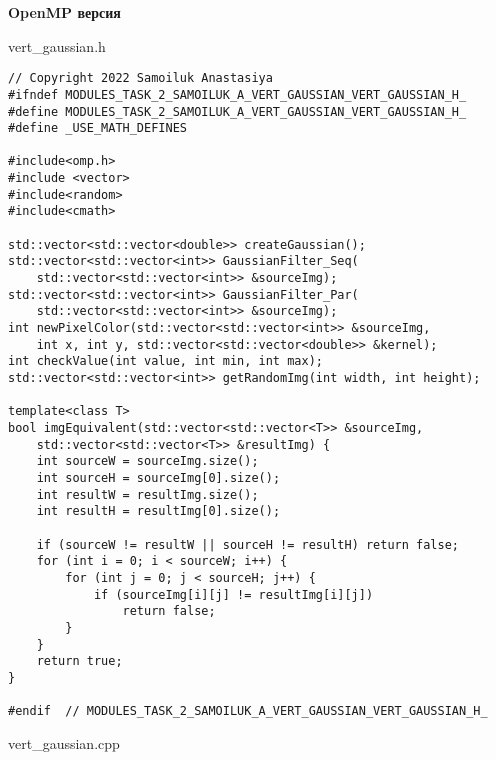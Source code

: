 \documentclass{report}
\begin{document}
\textbf{OpenMP версия}
\par vert\_gaussian.h
\begin{lstlisting}
// Copyright 2022 Samoiluk Anastasiya
#ifndef MODULES_TASK_2_SAMOILUK_A_VERT_GAUSSIAN_VERT_GAUSSIAN_H_
#define MODULES_TASK_2_SAMOILUK_A_VERT_GAUSSIAN_VERT_GAUSSIAN_H_
#define _USE_MATH_DEFINES

#include<omp.h>
#include <vector>
#include<random>
#include<cmath>

std::vector<std::vector<double>> createGaussian();
std::vector<std::vector<int>> GaussianFilter_Seq(
    std::vector<std::vector<int>> &sourceImg);
std::vector<std::vector<int>> GaussianFilter_Par(
    std::vector<std::vector<int>> &sourceImg);
int newPixelColor(std::vector<std::vector<int>> &sourceImg,
    int x, int y, std::vector<std::vector<double>> &kernel);
int checkValue(int value, int min, int max);
std::vector<std::vector<int>> getRandomImg(int width, int height);

template<class T>
bool imgEquivalent(std::vector<std::vector<T>> &sourceImg,
    std::vector<std::vector<T>> &resultImg) {
    int sourceW = sourceImg.size();
    int sourceH = sourceImg[0].size();
    int resultW = resultImg.size();
    int resultH = resultImg[0].size();

    if (sourceW != resultW || sourceH != resultH) return false;
    for (int i = 0; i < sourceW; i++) {
        for (int j = 0; j < sourceH; j++) {
            if (sourceImg[i][j] != resultImg[i][j])
                return false;
        }
    }
    return true;
}

#endif  // MODULES_TASK_2_SAMOILUK_A_VERT_GAUSSIAN_VERT_GAUSSIAN_H_
\end{lstlisting}
\par vert\_gaussian.cpp
\end{document}
